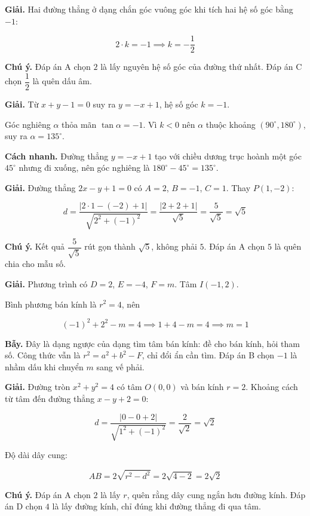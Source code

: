 \documentclass[11pt, a4paper]{article}
\begin{document}
\begin{dapan}[4 — Đáp án D]
\textbf{Giải.} Hai đường thẳng ở dạng chắn góc vuông góc khi tích hai hệ số góc bằng $-1$:

$$2 \cdot k = -1 \implies k = -\frac{1}{2}$$

\textbf{Chú ý.} Đáp án A chọn $2$ là lấy nguyên hệ số góc của đường thứ nhất. Đáp án C chọn $\dfrac{1}{2}$ là quên dấu âm.
\end{dapan}

\begin{dapan}[5 — Đáp án B]
\textbf{Giải.} Từ $x + y - 1 = 0$ suy ra $y = -x + 1$, hệ số góc $k = -1$.

Góc nghiêng $\alpha$ thỏa mãn $\tan\alpha = -1$. Vì $k < 0$ nên $\alpha$ thuộc khoảng $(90^\circ, 180^\circ)$, suy ra $\alpha = 135^\circ$.

\textbf{Cách nhanh.} Đường thẳng $y = -x + 1$ tạo với chiều dương trục hoành một góc $45^\circ$ nhưng đi xuống, nên góc nghiêng là $180^\circ - 45^\circ = 135^\circ$.
\end{dapan}

\begin{dapan}[6 — Đáp án D]
\textbf{Giải.} Đường thẳng $2x - y + 1 = 0$ có $A = 2$, $B = -1$, $C = 1$. Thay $P(1, -2)$:

$$d = \frac{|2 \cdot 1 - (-2) + 1|}{\sqrt{2^2 + (-1)^2}} = \frac{|2 + 2 + 1|}{\sqrt{5}} = \frac{5}{\sqrt{5}} = \sqrt{5}$$

\textbf{Chú ý.} Kết quả $\dfrac{5}{\sqrt{5}}$ rút gọn thành $\sqrt{5}$, không phải $5$. Đáp án A chọn $5$ là quên chia cho mẫu số.
\end{dapan}

\begin{dapan}[7 — Đáp án A]
\textbf{Giải.} Phương trình có $D = 2$, $E = -4$, $F = m$. Tâm $I(-1, 2)$.

Bình phương bán kính là $r^2 = 4$, nên

$$(-1)^2 + 2^2 - m = 4 \implies 1 + 4 - m = 4 \implies m = 1$$

\textbf{Bẫy.} Đây là dạng ngược của dạng tìm tâm bán kính: đề cho bán kính, hỏi tham số. Công thức vẫn là $r^2 = a^2 + b^2 - F$, chỉ đổi ẩn cần tìm. Đáp án B chọn $-1$ là nhầm dấu khi chuyển $m$ sang vế phải.
\end{dapan}

\begin{dapan}[8 — Đáp án C]
\textbf{Giải.} Đường tròn $x^2 + y^2 = 4$ có tâm $O(0,0)$ và bán kính $r = 2$. Khoảng cách từ tâm đến đường thẳng $x - y + 2 = 0$:

$$d = \frac{|0 - 0 + 2|}{\sqrt{1^2 + (-1)^2}} = \frac{2}{\sqrt{2}} = \sqrt{2}$$

Độ dài dây cung:

$$AB = 2\sqrt{r^2 - d^2} = 2\sqrt{4 - 2} = 2\sqrt{2}$$

\textbf{Chú ý.} Đáp án A chọn $2$ là lấy $r$, quên rằng dây cung ngắn hơn đường kính. Đáp án D chọn $4$ là lấy đường kính, chỉ đúng khi đường thẳng đi qua tâm.
\end{dapan}
\end{document}
